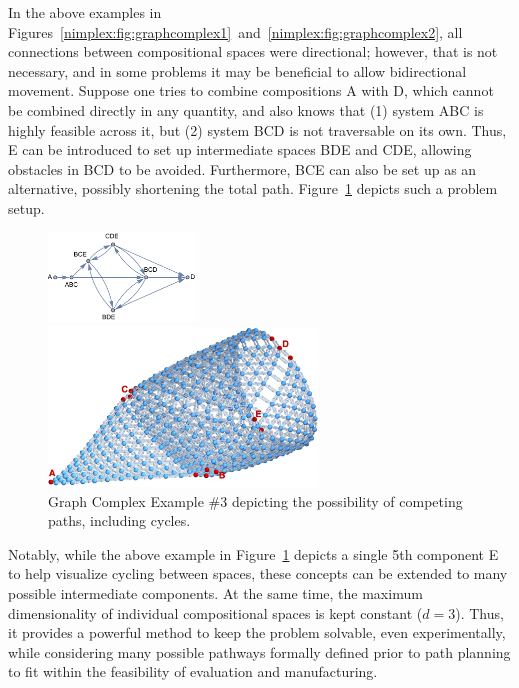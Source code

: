 In the above examples in Figures~\ref{nimplex:fig:graphcomplex1}~and~\ref{nimplex:fig:graphcomplex2}, all connections between compositional spaces were directional; however, that is not necessary, and in some problems it may be beneficial to allow bidirectional movement. Suppose one tries to combine compositions A with D, which cannot be combined directly in any quantity, and also knows that (1) system ABC is highly feasible across it, but (2) system BCD is not traversable on its own. Thus, E can be introduced to set up intermediate spaces BDE and CDE, allowing obstacles in BCD to be avoided. Furthermore, BCE can also be set up as an alternative, possibly shortening the total path. Figure~\ref{nimplex:fig:graphcomplex3} depicts such a problem setup.

\begin{figure}[h]
    \centering
    \begin{adjustbox}{valign=c}
        \includegraphics[width=0.35\textwidth]{nimplex/GraphComplexMap3.png}
    \end{adjustbox}
    \hspace{6pt}
    \begin{adjustbox}{valign=c}
        \includegraphics[width=0.64\textwidth]{nimplex/GraphComplex3.jpeg}
    \end{adjustbox}
    \caption{Graph Complex Example \#3 depicting the possibility of competing paths, including cycles.} 
    \label{nimplex:fig:graphcomplex3}
\end{figure}

Notably, while the above example in Figure~\ref{nimplex:fig:graphcomplex3} depicts a single 5th component E to help visualize cycling between spaces, these concepts can be extended to many possible intermediate components. At the same time, the maximum dimensionality of individual compositional spaces is kept constant ($d=3$). Thus, it provides a powerful method to keep the problem solvable, even experimentally, while considering many possible pathways formally defined prior to path planning to fit within the feasibility of evaluation and manufacturing.




